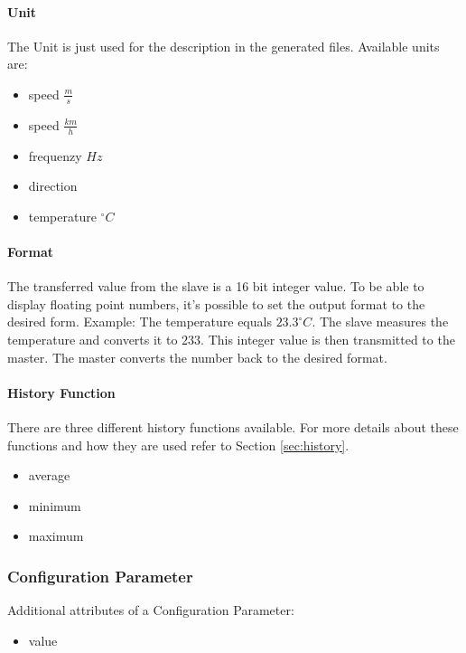 \paragraph{Unit} %
\label{par:unit}
The Unit is just used for the description in the generated files. Available units are:
\begin{itemize}
	\item speed $\frac{m}{s}$
	\item speed $\frac{km}{h}$
	\item frequenzy $Hz$
	\item direction
	\item temperature $^\circ C$
\end{itemize}


\paragraph{Format} %
\label{par:format}
The transferred value from the slave is a 16 bit integer value. To be able to display floating point numbers, it's possible to set the output format to the desired form. Example: The temperature equals $23.3 ^\circ C$. The slave measures the temperature and converts it to $233$. This integer value is then transmitted to the master. The master converts the number back to the desired format. 

\paragraph{History Function} %
\label{par:histfunc}
There are three different history functions available. For more details about these functions and how they are used refer to Section \ref{sec:history}.
\label{par:history_function}
\begin{itemize}
    \item average
    \item minimum
    \item maximum
\end{itemize}

\subsubsection{Configuration Parameter} %
\label{ssub:configuration_parameter}
Additional attributes of a Configuration Parameter:
\begin{itemize}
    \item value
\end{itemize}

